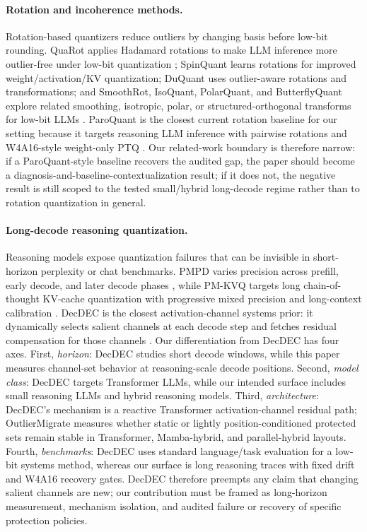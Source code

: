 \paragraph{Rotation and incoherence methods.}
Rotation-based quantizers reduce outliers by changing basis before low-bit
rounding.  QuaRot applies Hadamard rotations to make LLM inference more
outlier-free under low-bit quantization \citep{ashkboos2024quarot}; SpinQuant
learns rotations for improved weight/activation/KV quantization; DuQuant uses
outlier-aware rotations and transformations; and SmoothRot, IsoQuant,
PolarQuant, and ButterflyQuant explore related smoothing, isotropic, polar, or
structured-orthogonal transforms for low-bit LLMs
\citep{liu2024spinquant,lin2024duquant,huang2025smoothrot,kim2025isoquant,zhang2025polarquant,li2025butterflyquant}.
ParoQuant is the closest current rotation baseline for our setting because it
targets reasoning LLM inference with pairwise rotations and W4A16-style
weight-only PTQ \citep{liang2026paroquant}.  Our related-work boundary is
therefore narrow: if a ParoQuant-style baseline recovers the audited gap, the
paper should become a diagnosis-and-baseline-contextualization result; if it
does not, the negative result is still scoped to the tested small/hybrid
long-decode regime rather than to rotation quantization in general.

\paragraph{Long-decode reasoning quantization.}
Reasoning models expose quantization failures that can be invisible in
short-horizon perplexity or chat benchmarks.  PMPD varies precision across
prefill, early decode, and later decode phases \citep{chen2025pmpd}, while
PM-KVQ targets long chain-of-thought KV-cache quantization with progressive
mixed precision and long-context calibration \citep{liu2025pmkvq}.  DecDEC is
the closest activation-channel systems prior: it dynamically selects salient
channels at each decode step and fetches residual compensation for those
channels \citep{park2025decdec}.  Our differentiation from DecDEC has four
axes.  First, \emph{horizon}: DecDEC studies short decode windows, while this
paper measures channel-set behavior at reasoning-scale decode positions.
Second, \emph{model class}: DecDEC targets Transformer LLMs, while our
intended surface includes small reasoning LLMs and hybrid reasoning models.
Third, \emph{architecture}: DecDEC's mechanism is a reactive Transformer
activation-channel residual path; OutlierMigrate measures whether static or
lightly position-conditioned protected sets remain stable in Transformer,
Mamba-hybrid, and parallel-hybrid layouts.  Fourth, \emph{benchmarks}: DecDEC
uses standard language/task evaluation for a low-bit systems method, whereas
our surface is long reasoning traces with fixed drift and W4A16
recovery gates.  DecDEC therefore preempts any claim that changing salient
channels are new; our contribution must be framed as long-horizon measurement,
mechanism isolation, and audited failure or recovery of specific protection
policies.

